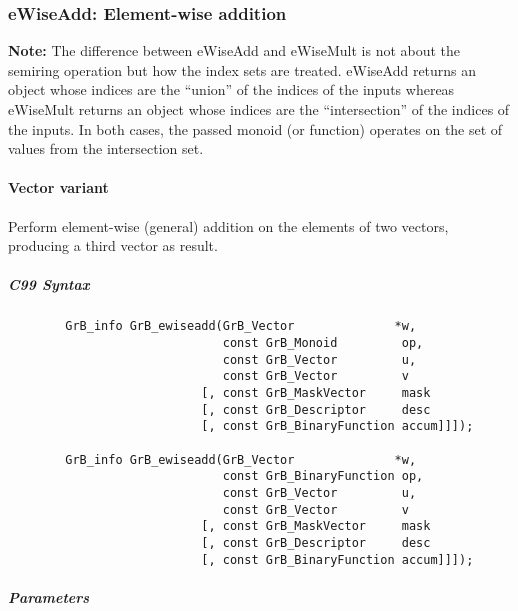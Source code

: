 \subsubsection{{\sf eWiseAdd}: Element-wise addition}

{\bf Note:} The difference between {\sf eWiseAdd} and {\sf eWiseMult} is not about the semiring operation but how the index sets are treated.
 {\sf eWiseAdd} returns an object whose indices are the ``union'' of the indices of the inputs whereas  
 {\sf eWiseMult} returns an object whose indices are the ``intersection'' of the indices of the inputs. In both cases, the passed monoid (or function) operates on the 
 set of values from the intersection set. 

\paragraph{Vector variant}

Perform element-wise (general) addition on the elements of two vectors,
producing a third vector as result.

\subparagraph{C99 Syntax}

\begin{verbatim}
        GrB_info GrB_ewiseadd(GrB_Vector              *w,
                              const GrB_Monoid         op, 
                              const GrB_Vector         u,
                              const GrB_Vector         v
                           [, const GrB_MaskVector     mask
                           [, const GrB_Descriptor     desc
                           [, const GrB_BinaryFunction accum]]]);
                            
        GrB_info GrB_ewiseadd(GrB_Vector              *w,
                              const GrB_BinaryFunction op, 
                              const GrB_Vector         u,
                              const GrB_Vector         v
                           [, const GrB_MaskVector     mask
                           [, const GrB_Descriptor     desc
                           [, const GrB_BinaryFunction accum]]]);
\end{verbatim}

\subparagraph{Parameters}


